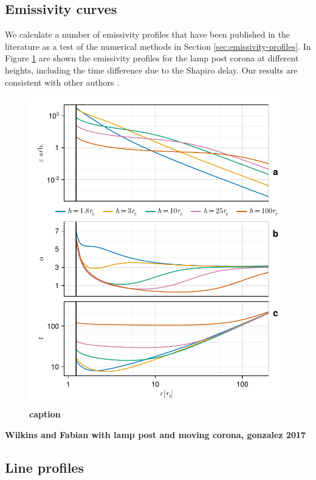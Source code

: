 \documentclass[fleqn,usenatbib]{mnras}
\newcommand{\todo}[1]{{\bf \color{red} #1}}
\begin{document}
\subsection{Emissivity curves}

We calculate a number of emissivity profiles that have been published in the literature as a test of the numerical methods in Section \ref{sec:emissivity-profiles}. In Figure \ref{fig:emissivity-profiles} are shown the emissivity profiles for the lamp post corona at different heights, including the time difference due to the Shapiro delay. Our results are consistent with other authors \citep{wilkins_understanding_2012,dauser_irradiation_2013}.

\begin{figure}
	\centering
	\includegraphics[width=0.99\linewidth]{figures/emissivity.point-source.pdf}
	\caption{\todo{caption}}
	\label{fig:emissivity-profiles}
\end{figure}

\todo{Wilkins and Fabian with lamp post and moving corona, gonzalez 2017}

\subsection{Line profiles}
\end{document}
